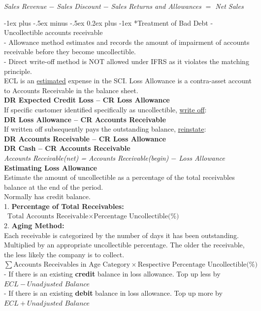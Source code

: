\documentclass[10pt,landscape]{article}
\makeatletter
\renewcommand{\subsubsection}{\@startsection{subsubsection}{3}{0mm}%
                                {-1ex plus -.5ex minus -.5ex}%
                                {0.2ex plus -1ex}%
                                {\normalfont\footnotesize\bfseries}}
\makeatother
\begin{document}
\begin{multicols}{3}
\begin{scriptsize}
\textit{Sales Revenue $-$ Sales Discount $-$ Sales Returns and Allowances $=$ Net Sales}

\subsubsection*{Treatment of Bad Debt}
- Uncollectible accounts receivable\\
- Allowance method estimates and records the amount of 
impairment of accounts receivable before they become 
uncollectible.\\
-  Direct write-off method is NOT allowed under IFRS as 
it violates the matching principle.\\
ECL is an \underline{estimated} expense in the SCI. Loss Allowance is a contra-asset account to Accounts Receivable in the balance sheet.\\
\textbf{DR Expected Credit Loss -- CR Loss Allowance}\\
If specific customer identified specifically as uncollectible, \underline{write off}:\\
\textbf{DR Loss Allowance -- CR Accounts Receivable}\\
If written off subsequently pays the outstanding balance, \underline{reinstate}:\\
\textbf{DR Accounts Receivable -- CR Loss Allowance}\\
\textbf{DR Cash -- CR Accounts Receivable}\\

\textit{Accounts Receivable(net) = Accounts Receivable(begin) $-$ Loss Allowance}\\

\textbf{Estimating Loss Allowance}\\
Estimate the amount of uncollectible as a percentage of 
the total receivables balance at the end of the period.\\
Normally has credit balance.\\
1. \textbf{Percentage of Total Receivables:}\\
$\text{ Total Accounts Receivable} \times \text{Percentage Uncollectible(\%)}$\\
2. \textbf{Aging Method:}\\
Each receivable is categorized by the number of days it has 
been outstanding.\\
Multiplied by an appropriate 
uncollectible percentage. The older the 
receivable, the less likely the company is to collect.\\
$\sum \text{Accounts Receivables in Age Category} \times \text{Respective Percentage Uncollectible(\%)}$\\
- If there is an existing \textbf{credit} balance in loss allowance. Top up less by $ECL - \textit{Unadjusted Balance}$\\
- If there is an existing \textbf{debit} balance in loss allowance. Top up more by $ECL + \textit{Unadjusted Balance}$\\



\end{scriptsize}
\end{multicols}
\end{document}
